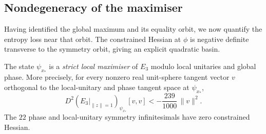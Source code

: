 \subsection{Nondegeneracy of the maximiser}\label{sec:seven-entropy-nondegenerate}
Having identified the global maximum and its equality orbit, we now quantify the entropy loss near that orbit.
The constrained Hessian at \(\phi\) is negative definite transverse to the symmetry orbit, giving
an explicit quadratic basin.

\begin{theorem}
\label{thm:entropy-seven-local}
The state \(\psi_{x_*}\) is a \emph{strict local maximiser} of
\(E_3\) modulo local unitaries and global phase. More precisely,
for every nonzero real unit-sphere tangent vector \(v\) orthogonal to the
local-unitary and phase tangent space at \(\psi_{x_*}\),
\begin{equation}\label{eq:entropy-seven-hessian-gap}
   D^2(E_3|_{\|z\|=1})_{\psi_{x_*}}[v,v]
      <-\frac{239}{1000}\,\|v\|^2.
\end{equation}
The \(22\) phase and local-unitary symmetry infinitesimals have
zero constrained Hessian.
\end{theorem}
